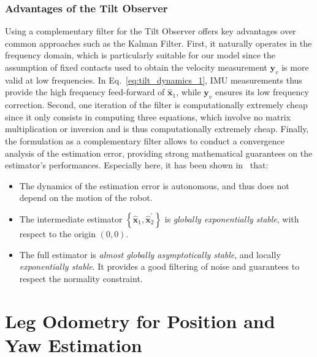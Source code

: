 \documentclass{IJCAS}
\begin{document}
\subsubsection{Advantages of the Tilt Observer}
Using a complementary filter for the Tilt Observer offers key advantages over common approaches such as the Kalman Filter. First, it naturally operates in the frequency domain, which is particularly suitable for our model since the assumption of fixed contacts used to obtain the velocity measurement $\boldsymbol{y}_v$ is more valid at low frequencies. In Eq.~\eqref{eq:tilt_dynamics_1}, IMU measurements thus provide the high frequency feed-forward of $\hat{\boldsymbol{x}}_{1}$, while $\boldsymbol{y}_v$ ensures its low frequency correction. Second, one iteration of the filter is computationally extremely cheap since it only consists in computing three equations, which involve no matrix multiplication or inversion and is thus computationally extremely cheap. Finally, the formulation as a complementary filter allows to conduct a convergence analysis of the estimation error, providing strong mathematical guarantees on the estimator's performances. Especially here, it has been shown in~\cite{benallegue2020LyapunovStableOrientationEstimatorHumanoids} that:
\begin{itemize}[leftmargin=0em]
    \item The dynamics of the estimation error is autonomous, and thus does not depend on the motion of the robot. 
    \item The intermediate estimator $\left\{\hat{\boldsymbol{x}}_{1}, \hat{\boldsymbol{x}}_{2}^{\prime} \right\}$ is \emph{globally exponentially stable}, with respect to the origin $\left(0,0\right)$.
    \item The full estimator is \emph{almost globally asymptotically stable}, and locally \emph{exponentially stable}. It provides a good filtering of noise and guarantees to respect the normality constraint.
\end{itemize}

\section{Leg Odometry for Position and Yaw Estimation} \label{sec:leg_odometry}
\end{document}
